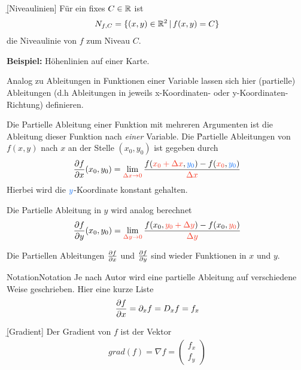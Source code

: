 \documentclass[12pt]{article}
\begin{document}
\begin{defn}{\b{[Niveaulinien]}}
        Für ein fixes $C\in\mathbb{R}$ ist
        \begin{align}
                N_{f,C}=\{(x,y)\in\mathbb{R}^2\,|\,f(x,y)=C\}
        \end{align}
        die Niveaulinie von $f$ zum Niveau $C$.

        \textbf{Beispiel:} Höhenlinien auf einer Karte.
\end{defn}

Analog zu Ableitungen in Funktionen einer Variable lassen sich hier (partielle)
Ableitungen (d.h Ableitungen in jeweils x-Koordinaten- oder
y-Koordinaten-Richtung) definieren.

\begin{thmb}{\emph{}}
        Die Partielle Ableitung einer Funktion mit mehreren Argumenten ist die Ableitung dieser Funktion nach \emph{einer} Variable. Die \r{Partielle Ableitungen von $f(x,y)$ nach $x$ an der Stelle $(x_0,y_0)$} ist gegeben durch
        \begin{align}
                \pdv{f}{x}(x_0,y_0)=\lim_{\r{\Delta x\to0}}\frac{f(\r{x_0+\Delta x},\b{y_0})-f(\r{x_0},\b{y_0
                        })}{\r{\Delta x}}
        \end{align}
        Hierbei wird die $\b y$-Koordinate konstant gehalten.

        Die Partielle Ableitung in \r{$y$} wird analog berechnet
        \begin{align}
                \pdv{f}{y}(x_0,y_0)=\lim_{\r{\Delta y\to0}}\frac{f(x_0,\r{y_0+\Delta y})-f(x_0,\r{y_0})}{\r{\Delta y}}
        \end{align}
\end{thmb}

Die Partiellen Ableitungen $\pdv{f}{x}$ und $\pdv{f}{y}$ sind wieder Funktionen
in $x$ und $y$.

\begin{rmk}{Notation}{Notation}
        Je nach Autor wird eine partielle Ableitung auf verschiedene Weise geschrieben. Hier eine kurze Liste
        \begin{align*}
                \pdv{f}{x} = \partial_x f = D_x f = f_x
        \end{align*}
\end{rmk}\vspace*{1em}

\begin{defn}{\b{[Gradient]}}
        Der Gradient  von $f$ ist der Vektor
        \begin{align}
                grad(f)=\nabla f = \begin{pmatrix}
                                           f_x \\
                                           f_y
                                   \end{pmatrix}
        \end{align}
\end{defn}
\end{document}
